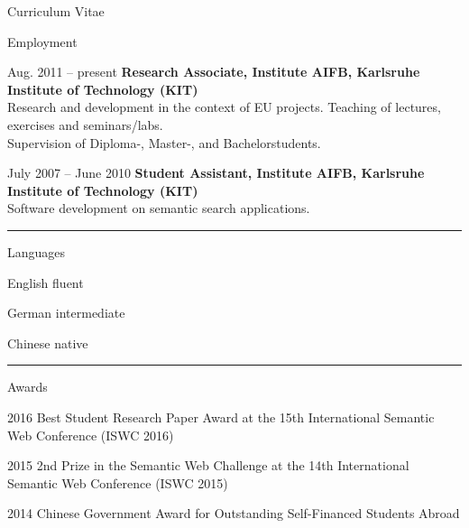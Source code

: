 \begin{cv}{\centerline{\LARGE Curriculum Vitae}}
  \begin{cvlist}{Employment}
  \item[Aug. 2011 -- present]\textbf{Research Associate, Institute AIFB, Karlsruhe Institute of Technology (KIT)}\\
    Research and development in the context of EU projects. 
    Teaching of lectures, exercises and seminars/labs.\\
    Supervision of Diploma-, Master-, and Bachelorstudents.
  \item[July 2007 -- June 2010]\textbf{Student Assistant, Institute AIFB, Karlsruhe Institute of Technology (KIT)}\\
    Software development on semantic search applications.
  \end{cvlist}



  \hrule

  \begin{cvlist}{Languages}
  \item[English] fluent
  \item[German] intermediate
  \item[Chinese] native
  \end{cvlist}

  \hrule

  \begin{cvlist}{Awards}
  \item[2016] Best Student Research Paper Award at the 15th International Semantic Web Conference (ISWC 2016)
  \item[2015] 2nd Prize in the Semantic Web Challenge at the 14th International Semantic Web Conference (ISWC 2015)
  \item[2014] Chinese Government Award for Outstanding Self-Financed Students Abroad 
  \end{cvlist}


\end{cv}
